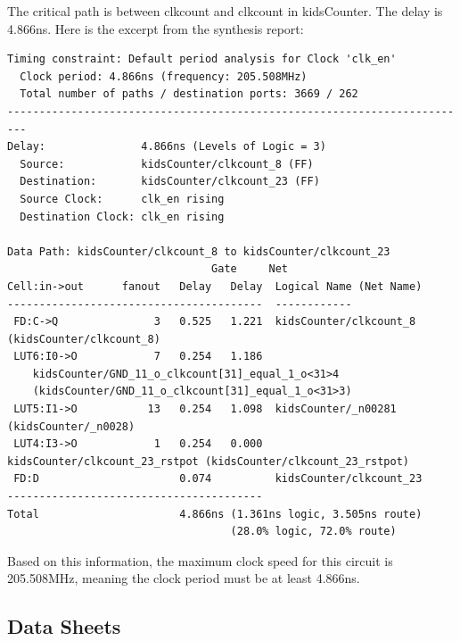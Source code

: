 \documentclass{article}
\begin{document}

    The critical path is between clkcount and clkcount in kidsCounter. The delay is 4.866ns. Here is the excerpt from the synthesis report:

    \begin{lstlisting}
Timing constraint: Default period analysis for Clock 'clk_en'
  Clock period: 4.866ns (frequency: 205.508MHz)
  Total number of paths / destination ports: 3669 / 262
-------------------------------------------------------------------------
Delay:               4.866ns (Levels of Logic = 3)
  Source:            kidsCounter/clkcount_8 (FF)
  Destination:       kidsCounter/clkcount_23 (FF)
  Source Clock:      clk_en rising
  Destination Clock: clk_en rising

Data Path: kidsCounter/clkcount_8 to kidsCounter/clkcount_23
                                Gate     Net
Cell:in->out      fanout   Delay   Delay  Logical Name (Net Name)
----------------------------------------  ------------
 FD:C->Q               3   0.525   1.221  kidsCounter/clkcount_8 (kidsCounter/clkcount_8)
 LUT6:I0->O            7   0.254   1.186  
    kidsCounter/GND_11_o_clkcount[31]_equal_1_o<31>4 
    (kidsCounter/GND_11_o_clkcount[31]_equal_1_o<31>3)
 LUT5:I1->O           13   0.254   1.098  kidsCounter/_n00281 (kidsCounter/_n0028)
 LUT4:I3->O            1   0.254   0.000  kidsCounter/clkcount_23_rstpot (kidsCounter/clkcount_23_rstpot)
 FD:D                      0.074          kidsCounter/clkcount_23
----------------------------------------
Total                      4.866ns (1.361ns logic, 3.505ns route)
                                   (28.0% logic, 72.0% route)
    \end{lstlisting}

    Based on this information, the maximum clock speed for this circuit is 205.508MHz, meaning the clock period must be at least 4.866ns.

	\subsection{Data Sheets}
\end{document}
